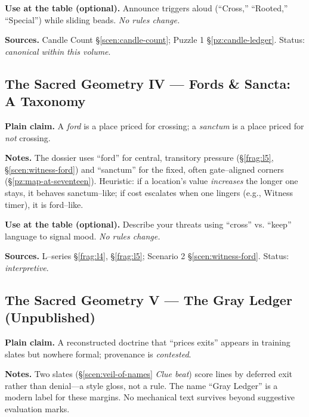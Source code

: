 \documentclass[11pt]{article}
\begin{document}
\begin{itemize}
\medskip
\noindent\textbf{Use at the table (optional).} Announce triggers aloud (“Cross,” “Rooted,” “Special”) while sliding beads. \emph{No rules change.}

\medskip
\noindent\textbf{Sources.} Candle Count \S\ref{scen:candle-count}; Puzzle 1 \S\ref{pz:candle-ledger}. Status: \emph{canonical within this volume}.


\subsection{The Sacred Geometry IV — Fords \& Sancta: A Taxonomy}
\label{konmetry:ford-vs-sanctum}
{}

\noindent\textbf{Plain claim.} A \emph{ford} is a place priced for crossing; a \emph{sanctum} is a place priced for \emph{not} crossing.

\medskip
\noindent\textbf{Notes.} The dossier uses “ford” for central, transitory pressure (\S\ref{frag:l5}, \S\ref{scen:witness-ford}) and “sanctum” for the fixed, often gate–aligned corners (\S\ref{pz:map-at-seventeen}). Heuristic: if a location’s value \emph{increases} the longer one stays, it behaves sanctum–like; if cost escalates when one lingers (e.g., Witness timer), it is ford–like.

\medskip
\noindent\textbf{Use at the table (optional).} Describe your threats using “cross” vs. “keep” language to signal mood. \emph{No rules change.}

\medskip
\noindent\textbf{Sources.} L–series \S\ref{frag:l4}, \S\ref{frag:l5}; Scenario 2 \S\ref{scen:witness-ford}. Status: \emph{interpretive}.

\subsection{The Sacred Geometry V — The Gray Ledger (Unpublished)}
\label{konmetry:gray-ledger}
{}

\noindent\textbf{Plain claim.} A reconstructed doctrine that “prices exits” appears in training slates but nowhere formal; provenance is \emph{contested}.

\medskip
\noindent\textbf{Notes.} Two slates (\S\ref{scen:veil-of-names} \emph{Clue beat}) score lines by deferred exit rather than denial—a style gloss, not a rule. The name “Gray Ledger” is a modern label for these margins. No mechanical text survives beyond suggestive evaluation marks.


\end{itemize}
\end{document}

